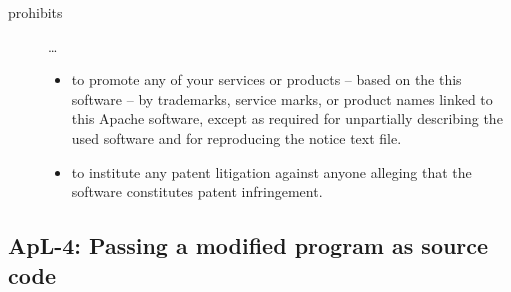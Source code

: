 \begin{description}
\item[prohibits] \ldots
\begin{itemize}
  \item to promote any of your services or products – based on the this software
  – by trademarks, service marks, or product names linked to this Apache
  software, except as required for unpartially describing the used software and
  for reproducing the notice text file.
  \item to institute any patent litigation against anyone alleging that the
  software constitutes patent infringement.
\end{itemize}

\end{description}

\subsection{ApL-4: Passing a modified program as source code}
\label{OSUC-04-Apache20} 


